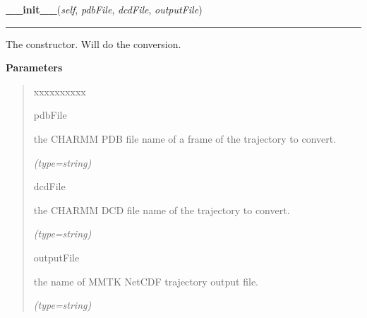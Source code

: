\hspace{.8\funcindent}\begin{boxedminipage}{\funcwidth}

    \raggedright \textbf{\_\_init\_\_}(\textit{self}, \textit{pdbFile}, \textit{dcdFile}, \textit{outputFile})

    \vspace{-1.5ex}

    \rule{\textwidth}{0.5\fboxrule}
\setlength{\parskip}{2ex}
    The constructor. Will do the conversion.

\setlength{\parskip}{1ex}
      \textbf{Parameters}
      \vspace{-1ex}

      \begin{quote}
        \begin{Ventry}{xxxxxxxxxx}

          \item[pdbFile]

          the CHARMM PDB file name of a frame of the trajectory to convert.

            {\it (type=string)}

          \item[dcdFile]

          the CHARMM DCD file name of the trajectory to convert.

            {\it (type=string)}

          \item[outputFile]

          the name of MMTK NetCDF trajectory output file.

            {\it (type=string)}

        \end{Ventry}

      \end{quote}

    \end{boxedminipage}



